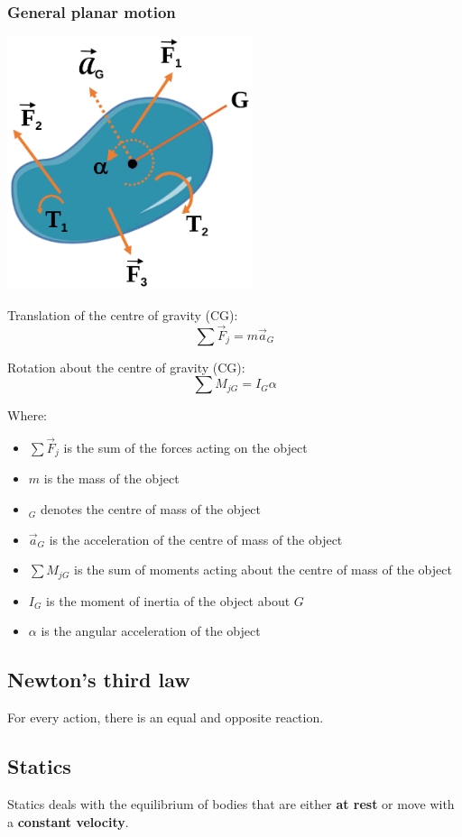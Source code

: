 \documentclass[11pt]{article}
\begin{document}
\subsubsection{General planar motion}
\label{sec:orgac58dab}
\begin{center}
\includegraphics[height=20em]{./images/general-planar-motion-diagram.png}
\end{center}

Translation of the centre of gravity (CG):
\[\sum \vec{F}_j = m \vec{a}_G\]

Rotation about the centre of gravity (CG):
\[\sum M_{jG} = I_G \alpha\]

Where:
\begin{itemize}
\item \(\sum \vec{F}_j\) is the sum of the forces acting on the object
\item \(m\) is the mass of the object
\item \(_G\) denotes the centre of mass of the object
\item \(\vec{a}_G\) is the acceleration of the centre of mass of the object
\item \(\sum M_{jG}\) is the sum of moments acting about the centre of mass of the object
\item \(I_G\) is the moment of inertia of the object about \(G\)
\item \(\alpha\) is the angular acceleration of the object
\end{itemize}
\subsection{Newton's third law}
\label{sec:orga1f73cf}
For every action, there is an equal and opposite reaction.
\subsection{Statics}
\label{sec:orgdd21760}
Statics deals with the equilibrium of bodies that are either \textbf{at rest} or move with a \textbf{constant velocity}.
\end{document}
